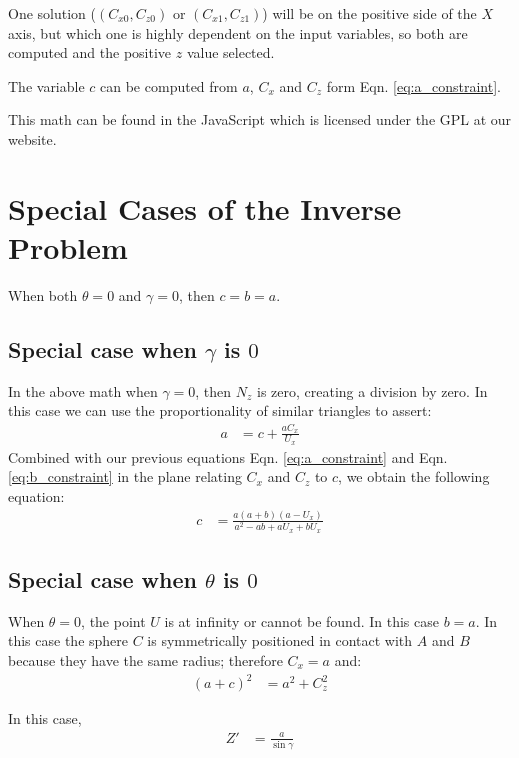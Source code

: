 \documentclass{article}
\begin{document}
One solution ($(C_{x0},C_{z0})$ or $(C_{x1},C_{z1})$) will be on the
positive side of the $X$ axis, but which one is highly dependent
on the input variables, so both are computed and the positive $z$
value selected.

The variable $c$ can be computed from $a$, $C_x$ and $C_z$
form Eqn. \ref{eq:a_constraint}.

This math can be found in the JavaScript which is licensed
under the GPL\cite{gplv3} at our website\cite{softrobotcalc}.

\section{Special Cases of the Inverse Problem}

When both $\theta = 0$ and $\gamma = 0$, then $c = b = a$.

\subsection{Special case when $\gamma$ is $0$ }

In the above math when $\gamma = 0$, then $N_z$ is zero,
creating a division by zero.
In this case we can use the proportionality of similar
triangles to assert:
\begin{align}
  a &= c + \frac{a C_x}{U_x}
\end{align}
Combined with our previous equations
Eqn. \ref{eq:a_constraint} and Eqn. \ref{eq:b_constraint} in the plane
relating $C_x$ and $C_z$ to $c$,
we obtain the following equation:
\begin{align}
c & = \frac{a (a + b) (a - U_x)}{a^2 - a b + a U_x + b U_x}
\end{align}


\subsection{Special case when $\theta$ is $0$ }

When $\theta = 0$, the point $U$ is at infinity or
cannot be found. In this case $b = a$.
In this case the sphere $C$ is symmetrically
positioned in contact with $A$ and $B$ because
they have the same radius; therefore $C_x = a$ and:
\begin{align}
(a + c)^2 &= a^2 + C_z^2
\end{align}

In this case,
\begin{align}
Z' &= \frac{a}{\sin{\gamma}}
\end{align}
\end{document}
